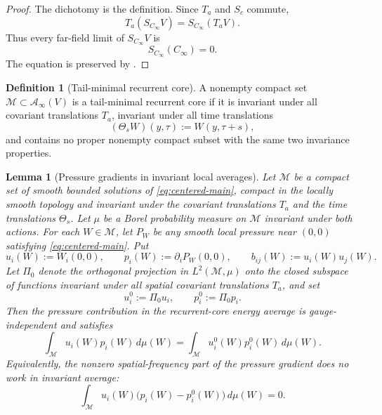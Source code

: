 \documentclass[11pt]{amsart}
\numberwithin{equation}{section}
\theoremstyle{plain}
\newtheorem{lemma}[theorem]{Lemma}
\theoremstyle{definition}
\newtheorem{definition}[theorem]{Definition}
\theoremstyle{remark}
\newcommand{\calA}{\mathcal A}
\newcommand{\calM}{\mathcal M}
\begin{document}
\begin{proof}
The dichotomy is the definition.  Since \(T_a\) and \(S_c\) commute,
\[
   T_a(S_{C_\infty}V)=S_{C_\infty}(T_aV).
\]
Thus every far-field limit of \(S_{C_\infty}V\) is
\[
   S_{C_\infty}(C_\infty)=0.
\]
The equation is preserved by .
\end{proof}

\begin{definition}[Tail-minimal recurrent core]
\label{def:tail-minimal-core}
A nonempty compact set \(\calM\subset\calA_\infty(V)\) is a tail-minimal
recurrent core if it is invariant under all covariant translations \(T_a\),
invariant under all time translations
\[
   (\Theta_sW)(y,\tau):=W(y,\tau+s),
\]
and contains no proper nonempty compact subset with the same two invariance
properties.
\end{definition}

\begin{lemma}[Pressure gradients in invariant local averages]
\label{lem:recurrent-core-pressure-gauges}
Let \(\calM\) be a compact set of smooth bounded solutions of
\eqref{eq:centered-main}, compact in the locally smooth topology and invariant
under the covariant translations \(T_a\) and the time translations
\(\Theta_s\).  Let \(\mu\) be a Borel probability measure on \(\calM\)
invariant under both actions.  For each \(W\in\calM\), let \(P_W\) be any
smooth local pressure near \((0,0)\) satisfying \eqref{eq:centered-main}.  Put
\[
   u_i(W):=W_i(0,0),
   \qquad
   p_i(W):=\partial_iP_W(0,0),
   \qquad
   b_{ij}(W):=u_i(W)u_j(W).
\]
Let \(\Pi_0\) denote the orthogonal projection in
\(L^2(\calM,\mu)\) onto the closed subspace of functions invariant under all
spatial covariant translations \(T_a\), and set
\[
   u_i^0:=\Pi_0u_i,\qquad p_i^0:=\Pi_0p_i.
\]
Then the pressure contribution in the recurrent-core energy average is
gauge-independent and satisfies
\begin{equation}\label{eq:pressure-average-core}
   \int_{\calM}u_i(W)p_i(W)\,d\mu(W)
   =
   \int_{\calM}u_i^0(W)p_i^0(W)\,d\mu(W).
\end{equation}
Equivalently, the nonzero spatial-frequency part of the pressure gradient
does no work in invariant average:
\begin{equation}\label{eq:pressure-nonzero-modes-core}
   \int_{\calM}u_i(W)\bigl(p_i(W)-p_i^0(W)\bigr)\,d\mu(W)=0 .
\end{equation}
\end{lemma}
\end{document}
